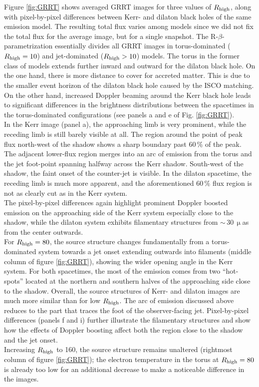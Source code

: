 \documentclass[a4paper,11pt]{article}
\begin{document}
Figure \ref{fig:GRRT} shows averaged GRRT images for three values of $R_{\rm high}$, along with pixel-by-pixel differences between Kerr- and dilaton black holes of the same emission model. The resulting total flux varies among models since we did not fix the total flux for the average image, but for a single snapshot. The R-$\beta$-parametrization essentially divides all GRRT images in torus-dominated ($R_{\rm high}=10$) and jet-dominated ($R_{\rm high}>10$) models. The torus in the former class of models extends further inward and outward for the dilaton black hole. On the one hand, there is more distance to cover for accreted matter. This is due to the smaller event horizon of the dilaton black hole caused by the ISCO matching. On the other hand, increased Doppler beaming around the Kerr black hole leads to significant differences in the brightness distributions between the spacetimes in the torus-dominated configurations (see panels a and e of Fig. \ref{fig:GRRT}).\\
In the Kerr image (panel a), the approaching limb is very prominent, while the receding limb is still barely visible at all. The region around the point of peak flux north-west of the shadow shows a sharp boundary past 60\,\% of the peak. The adjacent lower-flux region merges into an arc of emission from the torus and the jet foot-point spanning halfway across the Kerr shadow. South-west of the shadow, the faint onset of the counter-jet is visible. In the dilaton spacetime, the receding limb is much more apparent, and the aforementioned 60\,\% flux region is not as clearly cut as in the Kerr system.\\
The pixel-by-pixel differences again highlight prominent Doppler boosted emission on the approaching side of the Kerr system especially close to the shadow, while the dilaton system exhibits filamentary structures from $\sim$\,30\,$\upmu$as from the center outwards.\\

For $R_{\rm high}=80$, the source structure changes fundamentally from a torus-dominated system towards a jet onset extending outwards into filaments (middle column of figure \ref{fig:GRRT}), showing the wider opening angle in the Kerr system. For both spacetimes, the most of the emission comes from two ``hot-spots'' located at the northern and southern halves of the approaching side close to the shadow. Overall, the source structures of Kerr- and dilaton images are much more similar than for low $R_{\rm high}$. The arc of emission discussed above reduces to the part that traces the foot of the observer-facing jet. Pixel-by-pixel differences (panels f and i) further illustrate the filamentary structures and show how the effects of Doppler boosting affect both the region close to the shadow and the jet onset.\\
Increasing $R_{\rm high}$ to 160, the source structure remains unaltered (rightmost column of figure \ref{fig:GRRT}); the electron temperature in the torus at $R_{\rm high}=80$ is already too low for an additional decrease to make a noticeable difference in the images.
\end{document}
